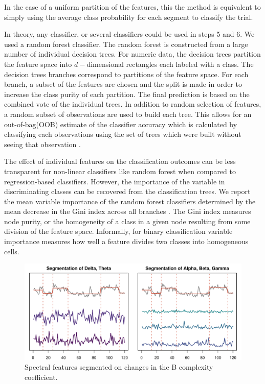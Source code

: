 In the case of a uniform partition of the features, this
the method is equivalent to simply using the average class probability for each segment to classify the trial.


In theory, any classifier, or several classifiers could be used in steps 5 and 6. We used a random forest classifier. The random forest is constructed from a large number of individual decision trees. For numeric data, the decision trees partition the feature space into $d-$dimensional rectangles each labeled with a class\cite{friedman2001}. The decision trees branches correspond to partitions of the feature space. For each branch, a subset of the features are chosen and the split is made in order to increase the class purity of each partition. The final prediction is based on the combined vote of the individual trees.  In addition to random selection of features, a random subset of observations are used to build each tree. This allows for an out-of-bag(OOB) estimate of the classifier 
accuracy which is calculated by classifying each observations using the set of trees which were built without seeing that observation \cite{breiman2001}.

The effect of individual features on the classification outcomes
can be less transparent for non-linear classifiers like random forest
when compared to regression-based classifiers. However, the 
importance of the variable in discriminating classes can 
be recovered from the classification trees. 
We report the mean variable importance of the random forest classifiers determined by the mean decrease in the 
Gini index across all branches
\cite{breiman2001}. The Gini index measures node purity, or 
the homogeneity of a class in a given node resulting from 
some division of the feature space. Informally, for binary 
classification variable importance measures how well a feature divides two classes into homogeneous cells.
\begin{figure}[!htbp]
  \begin{center}
  \includegraphics[width = \textwidth, keepaspectratio]{./figs/eeg-segment-plot.pdf}
  \end{center}
  \label{fig:segplot} 
  \caption{Spectral features segmented on changes in the B complexity coefficient.}
\end{figure}

